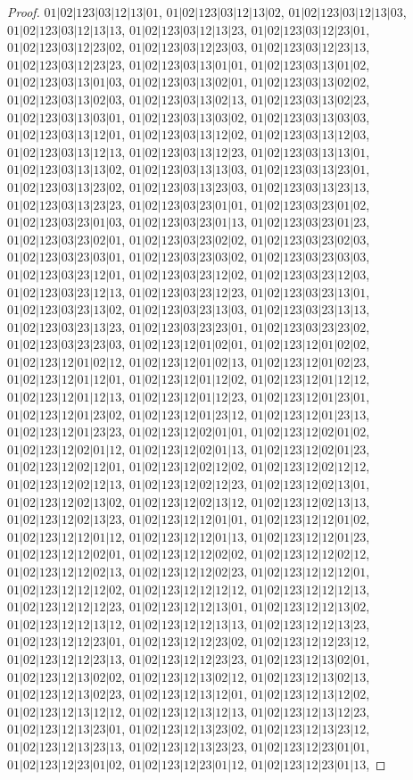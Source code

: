 \documentclass[12pt]{article}
\theoremstyle{plain}
\theoremstyle{definition}
\theoremstyle{remark}
\begin{document}
\begin{proof}
$01|02|123|03|12|13|01$, $01|02|123|03|12|13|02$, $01|02|123|03|12|13|03$, $01|02|123|03|12|13|13$, $01|02|123|03|12|13|23$, $01|02|123|03|12|23|01$, $01|02|123|03|12|23|02$, $01|02|123|03|12|23|03$, $01|02|123|03|12|23|13$, $01|02|123|03|12|23|23$, $01|02|123|03|13|01|01$, $01|02|123|03|13|01|02$, $01|02|123|03|13|01|03$, $01|02|123|03|13|02|01$, $01|02|123|03|13|02|02$, $01|02|123|03|13|02|03$, $01|02|123|03|13|02|13$, $01|02|123|03|13|02|23$, $01|02|123|03|13|03|01$, $01|02|123|03|13|03|02$, $01|02|123|03|13|03|03$, $01|02|123|03|13|12|01$, $01|02|123|03|13|12|02$, $01|02|123|03|13|12|03$, $01|02|123|03|13|12|13$, $01|02|123|03|13|12|23$, $01|02|123|03|13|13|01$, $01|02|123|03|13|13|02$, $01|02|123|03|13|13|03$, $01|02|123|03|13|23|01$, $01|02|123|03|13|23|02$, $01|02|123|03|13|23|03$, $01|02|123|03|13|23|13$, $01|02|123|03|13|23|23$, $01|02|123|03|23|01|01$, $01|02|123|03|23|01|02$, $01|02|123|03|23|01|03$, $01|02|123|03|23|01|13$, $01|02|123|03|23|01|23$, $01|02|123|03|23|02|01$, $01|02|123|03|23|02|02$, $01|02|123|03|23|02|03$, $01|02|123|03|23|03|01$, $01|02|123|03|23|03|02$, $01|02|123|03|23|03|03$, $01|02|123|03|23|12|01$, $01|02|123|03|23|12|02$, $01|02|123|03|23|12|03$, $01|02|123|03|23|12|13$, $01|02|123|03|23|12|23$, $01|02|123|03|23|13|01$, $01|02|123|03|23|13|02$, $01|02|123|03|23|13|03$, $01|02|123|03|23|13|13$, $01|02|123|03|23|13|23$, $01|02|123|03|23|23|01$, $01|02|123|03|23|23|02$, $01|02|123|03|23|23|03$, $01|02|123|12|01|02|01$, $01|02|123|12|01|02|02$, $01|02|123|12|01|02|12$, $01|02|123|12|01|02|13$, $01|02|123|12|01|02|23$, $01|02|123|12|01|12|01$, $01|02|123|12|01|12|02$, $01|02|123|12|01|12|12$, $01|02|123|12|01|12|13$, $01|02|123|12|01|12|23$, $01|02|123|12|01|23|01$, $01|02|123|12|01|23|02$, $01|02|123|12|01|23|12$, $01|02|123|12|01|23|13$, $01|02|123|12|01|23|23$, $01|02|123|12|02|01|01$, $01|02|123|12|02|01|02$, $01|02|123|12|02|01|12$, $01|02|123|12|02|01|13$, $01|02|123|12|02|01|23$, $01|02|123|12|02|12|01$, $01|02|123|12|02|12|02$, $01|02|123|12|02|12|12$, $01|02|123|12|02|12|13$, $01|02|123|12|02|12|23$, $01|02|123|12|02|13|01$, $01|02|123|12|02|13|02$, $01|02|123|12|02|13|12$, $01|02|123|12|02|13|13$, $01|02|123|12|02|13|23$, $01|02|123|12|12|01|01$, $01|02|123|12|12|01|02$, $01|02|123|12|12|01|12$, $01|02|123|12|12|01|13$, $01|02|123|12|12|01|23$, $01|02|123|12|12|02|01$, $01|02|123|12|12|02|02$, $01|02|123|12|12|02|12$, $01|02|123|12|12|02|13$, $01|02|123|12|12|02|23$, $01|02|123|12|12|12|01$, $01|02|123|12|12|12|02$, $01|02|123|12|12|12|12$, $01|02|123|12|12|12|13$, $01|02|123|12|12|12|23$, $01|02|123|12|12|13|01$, $01|02|123|12|12|13|02$, $01|02|123|12|12|13|12$, $01|02|123|12|12|13|13$, $01|02|123|12|12|13|23$, $01|02|123|12|12|23|01$, $01|02|123|12|12|23|02$, $01|02|123|12|12|23|12$, $01|02|123|12|12|23|13$, $01|02|123|12|12|23|23$, $01|02|123|12|13|02|01$, $01|02|123|12|13|02|02$, $01|02|123|12|13|02|12$, $01|02|123|12|13|02|13$, $01|02|123|12|13|02|23$, $01|02|123|12|13|12|01$, $01|02|123|12|13|12|02$, $01|02|123|12|13|12|12$, $01|02|123|12|13|12|13$, $01|02|123|12|13|12|23$, $01|02|123|12|13|23|01$, $01|02|123|12|13|23|02$, $01|02|123|12|13|23|12$, $01|02|123|12|13|23|13$, $01|02|123|12|13|23|23$, $01|02|123|12|23|01|01$, $01|02|123|12|23|01|02$, $01|02|123|12|23|01|12$, $01|02|123|12|23|01|13$, 
\end{proof}
\end{document}
